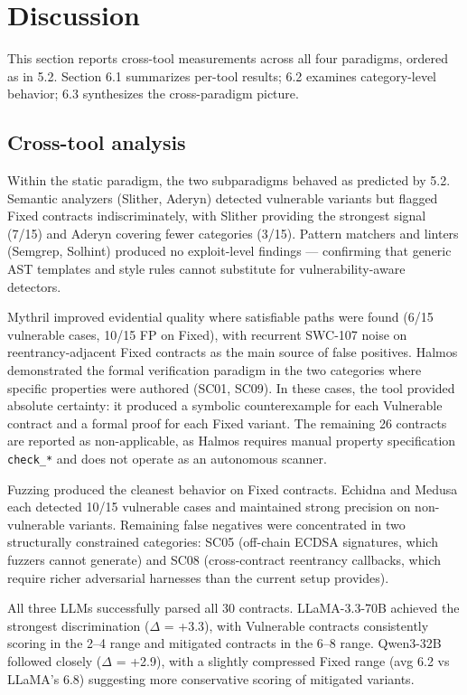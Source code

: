 \section{Discussion}
\label{chap:discussion}

This section reports cross-tool measurements across all four paradigms, ordered as in 5.2. Section 6.1 summarizes per-tool results; 6.2 examines category-level behavior; 6.3 synthesizes the cross-paradigm picture.

\subsection{Cross-tool analysis}

Within the static paradigm, the two subparadigms behaved as predicted by 5.2. Semantic analyzers (Slither, Aderyn) detected vulnerable variants but flagged Fixed contracts indiscriminately, with Slither providing the strongest signal (7/15) and Aderyn covering fewer categories (3/15). Pattern matchers and linters (Semgrep, Solhint) produced no exploit-level findings — confirming that generic AST templates and style rules cannot substitute for vulnerability-aware detectors.

Mythril improved evidential quality where satisfiable paths were found (6/15 vulnerable cases, 10/15 FP on Fixed), with recurrent SWC-107 noise on reentrancy-adjacent Fixed contracts as the main source of false positives. Halmos demonstrated the formal verification paradigm in the two categories where specific properties were authored (SC01, SC09). In these cases, the tool provided absolute certainty: it produced a symbolic counterexample for each Vulnerable contract and a formal proof for each Fixed variant. The remaining 26 contracts are reported as non-applicable, as Halmos requires manual property specification \texttt{check\_*} and does not operate as an autonomous scanner.

Fuzzing produced the cleanest behavior on Fixed contracts. Echidna and Medusa each detected 10/15 vulnerable cases and maintained strong precision on non-vulnerable variants. Remaining false negatives were concentrated in two structurally constrained categories: SC05 (off-chain ECDSA signatures, which fuzzers cannot generate) and SC08 (cross-contract reentrancy callbacks, which require richer adversarial harnesses than the current setup provides).  

All three LLMs successfully parsed all 30 contracts. LLaMA-3.3-70B achieved the strongest discrimination ($\Delta$ = +3.3), with Vulnerable contracts consistently scoring in the 2–4 range and mitigated contracts in the 6–8 range. Qwen3-32B followed closely ($\Delta$ = +2.9), with a slightly compressed Fixed range (avg 6.2 vs LLaMA's 6.8) suggesting more conservative scoring of mitigated variants.

